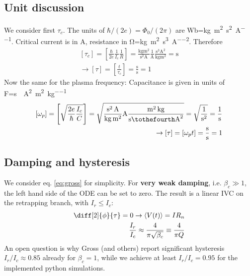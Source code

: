 \documentclass[reprint,onecolumn,%
amsmath,amssymb,aip,apl]{revtex4-1}
\begin{document}
	\subsection{Unit discussion}
	We consider first $\tau_c$.
	The units of $\hbar/(2e)=\Phi_0/(2\pi)$ are \si{Wb}=\si{\kilogram\meter\squared\per\second\squared\per\ampere}.
	Critical current is in \si{\ampere}, resistance in \si{\ohm}=\si{\kilogram\meter\squared\per\second\cubed\per\ampere\squared}.
	Therefore
	\begin{eqnarray}
	\left[\tau_c\right]=\left[\frac{\hbar}{2e}\frac{1}{I_c}\frac{1}{R}\right] = \frac{\si{\kilogram\meter\squared}}{\si{\second\squared\ampere}}\frac{1}{\si{\ampere}}\frac{\si{\second\cubed\ampere\squared}}{\si{\kilogram\meter\squared}} = \si{\second} \\%
	\rightarrow \left[\tau\right]=\left[\frac{t}{\tau_c}\right]=\frac{\si{\second}}{\si{\second}}=1
	\end{eqnarray}
	Now the same for the plasma frequency:
	Capacitance is given in units of \si{F}=\si{\second\tothefourth\ampere\squared\per\meter\squared\per\kilogram}
	\begin{eqnarray}
	\left[\omega_p\right]=\left[\sqrt{\frac{2e}{\hbar}\frac{I_c}{C}}\right]=\sqrt{\frac{\si{\second\squared\ampere}}{\si{\kilogram\meter\squared}}\si{\ampere}\frac{\si{\meter\squared\kilogram}}{\si{\second\tothefourth\ampere\squared}}}=\sqrt{\frac{1}{\si{\second\squared}}}=\frac{1}{\si{\second}} \\%
	\rightarrow \left[\tau\right]=\left[\omega_p t\right]=\frac{\si{\second}}{\si{\second}}=1
	\end{eqnarray}
	
	\subsection{Damping and hysteresis}
	We consider eq. \ref{eq:gross} for simplicity.
	For \textbf{very weak damping}, i.e. $\beta_c\gg1$, the left hand side of the ODE can be set to zero.
	The result is a linear IVC on the retrapping branch, with $I_r\leq I_c$:
	\begin{eqnarray}
	\diff[2]{\phi}{\tau}=0 \rightarrow \langle V(t)\rangle=IR_n \\%
	\frac{I_r}{I_c}\approx\frac{4}{\pi\sqrt{\beta_c}}\equiv\frac{4}{\pi Q}
	\end{eqnarray}
	An open question is why Gross (and others) report significant hysteresis $I_r/I_c\approx0.85$ already for $\beta_c=1$, while we achieve at least $I_r/I_c=0.95$ for the implemented python simulations.
	
\end{document}
